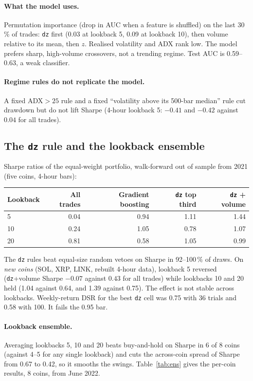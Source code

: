 \documentclass[11pt,a4paper]{article}
\newcommand{\code}[1]{\texttt{#1}}
\begin{document}
\paragraph{What the model uses.} Permutation importance (drop in AUC when a feature is shuffled) on the last 30\,\% of trades: \code{dz} first (0.03 at lookback 5, 0.09 at lookback 10), then volume relative to its mean, then
$z$. Realised volatility and ADX rank low. The model prefers sharp, high-volume crossovers, not a trending regime. Test AUC is 0.59--0.63, a weak classifier.

\paragraph{Regime rules do not replicate the model.} A fixed ADX$>25$ rule and a fixed ``volatility above its 500-bar median'' rule cut drawdown but do not lift Sharpe
(4-hour lookback 5: $-0.41$ and $-0.42$ against $0.04$ for all trades).

\subsection{The \texttt{dz} rule and the lookback ensemble}
Sharpe ratios of the equal-weight portfolio, walk-forward out of sample from 2021 (five coins, 4-hour bars):
\begin{center}\small\begin{tabular}{lrrrr}\toprule
Lookback & All trades & Gradient boosting & \code{dz} top third & \code{dz} + volume\\\midrule
5 & 0.04 & 0.94 & 1.11 & 1.44\\ 10 & 0.24 & 1.05 & 0.78 & 1.07\\ 20 & 0.81 & 0.58 & 1.05 & 0.99\\\bottomrule\end{tabular}\end{center}
The \code{dz} rules beat equal-size random vetoes on Sharpe in 92--100\,\% of draws. On \emph{new coins} (SOL, XRP, LINK, rebuilt 4-hour data), lookback 5 reversed
(\code{dz}+volume Sharpe $-0.07$ against $0.43$ for all trades) while lookbacks 10 and 20 held (1.04 against 0.64, and 1.39 against 0.75). The effect is not stable across lookbacks.
Weekly-return DSR for the best \code{dz} cell was 0.75 with 36 trials and 0.58 with 100. It fails the 0.95 bar.

\paragraph{Lookback ensemble.} Averaging lookbacks 5, 10 and 20 beats buy-and-hold on Sharpe in 6 of 8 coins (against 4--5 for any single lookback) and cuts the across-coin spread of Sharpe from 0.67 to 0.42,
so it smooths the swings. Table~\ref{tab:ens} gives the per-coin results, 8 coins, from June 2022.
\end{document}
